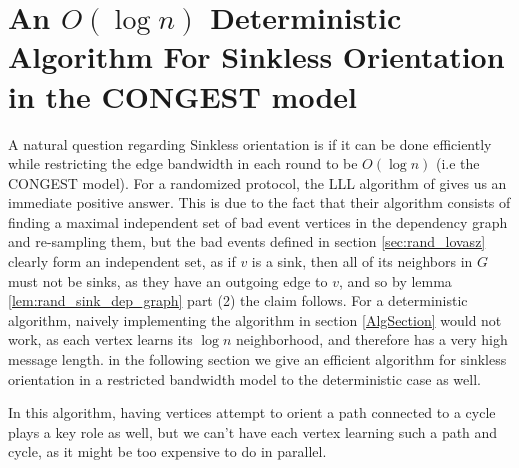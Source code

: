 \section{An $O(\log{n})$ Deterministic Algorithm For Sinkless Orientation in the CONGEST model}
 A natural question regarding Sinkless orientation is if it can be done efficiently while restricting the edge bandwidth in each round to be $O(\log{n})$ (i.e the CONGEST model). For a randomized protocol, the LLL algorithm of \cite{KMPHH14} gives us an immediate positive answer. This is due to the fact that their algorithm consists of finding a maximal independent set of bad event vertices in the dependency graph and re-sampling them, but the bad events defined in section \ref{sec:rand_lovasz} clearly form an independent set, as if $v$ is a sink, then all of its neighbors in $G$ must not be sinks, as they have an outgoing edge to $v$, and so by lemma \ref{lem:rand_sink_dep_graph} part (2) the claim follows. For a deterministic algorithm, naively implementing the algorithm in section \ref{AlgSection} would not work, as each vertex learns its $\log{n}$ neighborhood, and therefore has a very high message length. in the following section we give an efficient algorithm for sinkless orientation in a restricted bandwidth model to the deterministic case as well.

In this algorithm, having vertices attempt to orient a path connected to a cycle plays a key role as well, but we can't have each vertex learning such a path and cycle, as it might be too expensive to do in parallel. 

